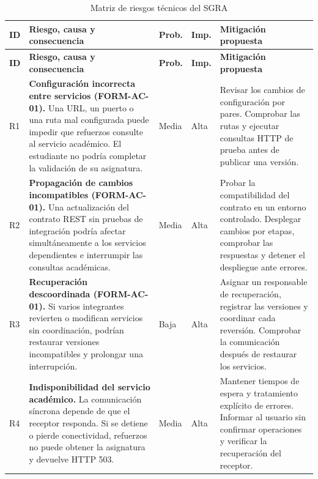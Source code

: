 \begingroup
\small
\setlength{\tabcolsep}{3pt}
\renewcommand{\arraystretch}{1.18}

\begin{longtable}{@{}p{}
p{}
p{}
p{}
p{}@{}}

\caption{Matriz de riesgos técnicos del SGRA}
\label{tab:riesgos-sgra}\\

\toprule
\textbf{ID} &
\textbf{Riesgo, causa y consecuencia} &
\textbf{Prob.} &
\textbf{Imp.} &
\textbf{Mitigación propuesta}\\
\midrule
\endfirsthead

\toprule
\textbf{ID} &
\textbf{Riesgo, causa y consecuencia} &
\textbf{Prob.} &
\textbf{Imp.} &
\textbf{Mitigación propuesta}\\
\midrule
\endhead

\bottomrule
\endlastfoot

R1 &
\textbf{Configuración incorrecta entre servicios
(FORM-AC-01).}
Una URL, un puerto o una ruta mal configurada
puede impedir que refuerzos consulte al
servicio académico. El estudiante no podría
completar la validación de su asignatura. &
Media &
Alta &
Revisar los cambios de configuración por pares.
Comprobar las rutas y ejecutar consultas HTTP
de prueba antes de publicar una versión.\\

\addlinespace[4pt]

R2 &
\textbf{Propagación de cambios incompatibles
(FORM-AC-01).}
Una actualización del contrato REST sin pruebas
de integración podría afectar simultáneamente
a los servicios dependientes e interrumpir
las consultas académicas. &
Media &
Alta &
Probar la compatibilidad del contrato en un
entorno controlado. Desplegar cambios por
etapas, comprobar las respuestas y detener
el despliegue ante errores.\\

\addlinespace[4pt]

R3 &
\textbf{Recuperación descoordinada
(FORM-AC-01).}
Si varios integrantes revierten o modifican
servicios sin coordinación, podrían restaurar
versiones incompatibles y prolongar una
interrupción. &
Baja &
Alta &
Asignar un responsable de recuperación,
registrar las versiones y coordinar cada
reversión. Comprobar la comunicación después
de restaurar los servicios.\\

\addlinespace[4pt]

R4 &
\textbf{Indisponibilidad del servicio académico.}
La comunicación síncrona depende de que
el receptor responda. Si se detiene o pierde
conectividad, refuerzos no puede obtener
la asignatura y devuelve HTTP 503. &
Media &
Alta &
Mantener tiempos de espera y tratamiento
explícito de errores. Informar al usuario
sin confirmar operaciones y verificar la
recuperación del receptor.\\


\end{longtable}
